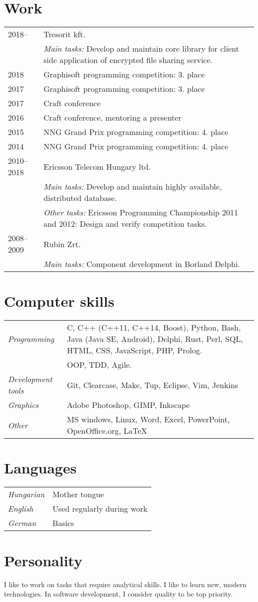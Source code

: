 \documentclass[a4paper,10pt]{article}
\newcommand{\pont}[1]{\emph{#1}}
\begin{document}
\section*{Work}
\begin{tabular}{lp{10cm}}
 2018--&Tresorit kft.\\
  &\emph{Main tasks:} Develop and maintain core library for client side application of encrypted file sharing service.\\
 2018&Graphisoft programming competition: 3. place\\
 2017&Graphisoft programming competition: 3. place\\
 2017&Craft conference\\
 2016&Craft conference, mentoring a presenter\\
 2015&NNG Grand Prix programming competition: 4. place\\
 2014&NNG Grand Prix programming competition: 4. place\\
 2010--2018&Ericsson Telecom Hungary ltd.\\
  &\emph{Main tasks:} Develop and maintain highly available, distributed database.\\
  &\emph{Other tasks:} Ericsson Programming Championship 2011 and 2012: Design and verify competition tasks.\\
 2008--2009&Rubin Zrt.\\
  &\emph{Main tasks:} Component development in Borland Delphi.
\end{tabular}

\section*{Computer skills}
\begin{tabular}{lp{12cm}}
 \pont{Programming}&C, C++ (C++11, C++14, Boost), Python, Bash, Java (Java SE, Android), Delphi, Rust, Perl, SQL, HTML, CSS, JavaScript, PHP, Prolog.\\
 &OOP, TDD, Agile.\\
 \pont{Development tools}&Git, Clearcase, Make, Tup, Eclipse, Vim, Jenkins\\
 \pont{Graphics}&Adobe Photoshop, GIMP, Inkscape\\
 \pont{Other}&MS windows, Linux, Word, Excel, PowerPoint, OpenOffice.org, LaTeX
\end{tabular}

\section*{Languages}
\begin{tabular}{ll}
 \pont{Hungarian}&Mother tongue\\
 \pont{English}&Used regularly during work\\
 \pont{German}&Basics
\end{tabular}

\section*{Personality}
I like to work on tasks that require analytical skills. I like to learn new, modern technologies. In software development, I consider quality to be top priority.
\end{document}
